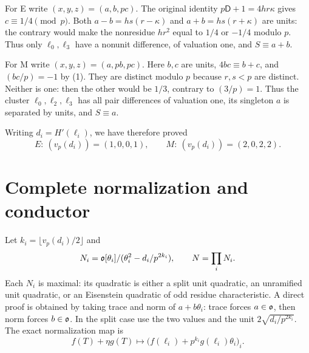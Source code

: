 For E write $(x,y,z)=(a,b,pc)$. The original identity
$p\mathsf D+1=4hr\kappa$ gives $c\equiv1/4\pmod p$.
Both $a-b=hs(r-\kappa)$ and $a+b=hs(r+\kappa)$ are units: the contrary would
make the nonresidue $hr^2$ equal to $1/4$ or $-1/4$ modulo $p$. Thus only
$\ell_0,\ell_3$ have a nonunit difference, of valuation one, and $S\equiv a+b$.

For M write $(x,y,z)=(a,pb,pc)$. Here $b,c$ are units,
$4bc\equiv b+c$, and $(bc/p)=-1$ by (1). They are distinct modulo $p$ because
$r,s<p$ are distinct. Neither is one: then the other would be $1/3$, contrary
to $(3/p)=1$. Thus the cluster $\ell_0,\ell_2,\ell_3$ has all pair differences
of valuation one, its singleton $a$ is separated by units, and $S\equiv a$.

Writing $d_i=H'(\ell_i)$, we have therefore proved
\[
 E:\ (v_p(d_i))=(1,0,0,1),\qquad
 M:\ (v_p(d_i))=(2,0,2,2).                              \tag{3}
\]

\section{Complete normalization and conductor}
Let $k_i=\lfloor v_p(d_i)/2\rfloor$ and
\[
 N_i=\mathfrak o[\theta_i]/(\theta_i^2-d_i/p^{2k_i}),\qquad
 N=\prod_iN_i.
\]
Each $N_i$ is maximal: its quadratic is either a split unit quadratic, an
unramified unit quadratic, or an Eisenstein quadratic of odd residue
characteristic. A direct proof is obtained by taking trace and norm of
$a+b\theta_i$: trace forces $a\in\mathfrak o$, then norm forces $b\in\mathfrak o$.
In the split case use the two values and the unit $2\sqrt{d_i/p^{2k_i}}$.
The exact normalization map is
\[
 f(T)+\eta g(T)\longmapsto
 \bigl(f(\ell_i)+p^{k_i}g(\ell_i)\theta_i\bigr)_i.        \tag{4}
\]

